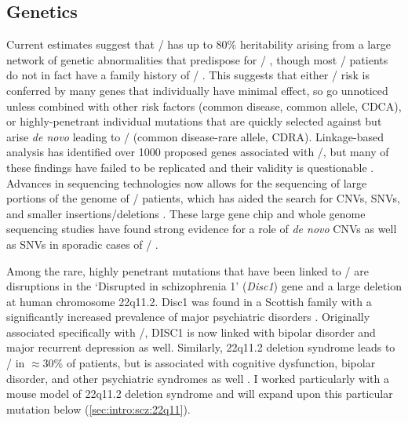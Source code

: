 \subsection{Genetics}
Current estimates suggest that \scz/ has up to 80\% heritability arising from a large network of genetic abnormalities that predispose for \scz/ \citep{Ripke2011, Tandon2008}, though most \scz/ patients do not in fact have a family history of \scz/ \citep{Tandon2008, Rodriguez-Murillo2012}.
This suggests that either \scz/ risk is conferred by many genes that individually have minimal effect, so go unnoticed unless combined with other risk factors (common disease, common allele, CDCA), or highly-penetrant individual mutations that are quickly selected against but arise \emph{de novo} leading to \scz/ (common disease-rare allele, CDRA).
Linkage-based analysis has identified over 1000 proposed genes associated with \scz/, but many of these findings have failed to be replicated and their validity is questionable \citep[\url{http://www.szgene.org}, ][]{Allen2008}.
Advances in sequencing technologies now allows for the sequencing of large portions of the genome of \scz/ patients, which has aided the search for \ac{CNVs}, \ac{SNVs}, and smaller insertions/deletions \citep{Rodriguez-Murillo2012}.
These large gene chip and whole genome sequencing studies have found strong evidence for a role of \emph{de novo} \ac{CNVs} as well as \ac{SNVs} in sporadic cases of \scz/ \citep{Xu2008, Xu2011}.

Among the rare, highly penetrant mutations that have been linked to \scz/ are disruptions in the `Disrupted in schizophrenia 1' (\emph{Disc1}) gene and a large deletion at human chromosome 22q11.2.
Disc1 was found in a Scottish family with a significantly increased prevalence of major psychiatric disorders \citep[reviewed in,][]{Brandon2009}.
Originally associated specifically with \scz/, DISC1 is now linked with bipolar disorder and major recurrent depression as well.
Similarly, 22q11.2 deletion syndrome leads to \scz/ in $\approx$30\% of patients, but is associated with cognitive dysfunction, bipolar disorder, and other psychiatric syndromes as well \citep{Nestler2010}.
I worked particularly with a mouse model of 22q11.2 deletion syndrome and will expand upon this particular mutation below (\autoref{sec:intro:scz:22q11}).

